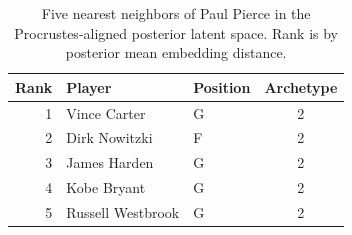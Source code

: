 \begin{table}[htbp]
  \centering\small
  \begin{tabular}{rllc}
    \toprule
    Rank & Player & Position & Archetype \\
    \midrule
    1 & Vince Carter & G & 2 \\
    2 & Dirk Nowitzki & F & 2 \\
    3 & James Harden & G & 2 \\
    4 & Kobe Bryant & G & 2 \\
    5 & Russell Westbrook & G & 2 \\
    \bottomrule
  \end{tabular}
  \caption{Five nearest neighbors of Paul Pierce in the Procrustes-aligned posterior latent space. Rank is by posterior mean embedding distance.}
\end{table}


